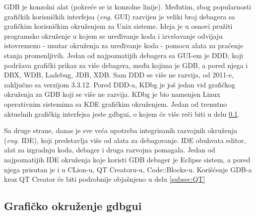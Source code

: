 \documentclass[a4paper]{article}
\begin{document}
GDB je konzolni alat (pokreće se iz konzolne linije). Međutim, zbog popularnosti grafičkih korisničkih interfejsa
(\textit{eng.} GUI) razvijen je veliki broj debagera sa grafičkim korisničkim okruženjem za Unix sisteme\cite{art_debugging}. 
Ideja je u osnovi pružiti programsko okruženje u kojem se uređivanje koda i izvršavanje odvijaju istovremeno - unutar okruženja za uređivanje
koda - pomocu alata za praćenje stanja promenljivih\cite{computerworld}.
Jedan od najpoznatijih debagera sa GUI-em je DDD, koji podržava grafički prikaz za više debagera, među kojima je
GDB, a pored njega i DBX, WDB, Ladebug, JDB, XDB. Sam DDD se više ne razvija, od 2011-e, zaključno sa verzijom 3.3.12. \cite{GNUOrg}
Pored DDD-a, KDbg je još jedan vid grafičkog okruženja za GDB koji se više ne razvija. KDbg je bio namenjen
Linux operativnim sistemima sa KDE grafičkim okruženjem. Jedan od trenutno aktuelnih grafičkig interfejsa jeste
gdbgui, o kojem će više reči biti u delu \ref{subsec:gdbgui}.

Sa druge strane, danas je sve veća upotreba integrisanih razvojnih okruženja (\textit{eng.} IDE),
koji predstavlja više od alata za debagovanje. IDE obuhvata editor, alat za izgradnju koda, debager i druga 
razvojna pomagala. Jedan od najpoznatijih IDE okruženja koje koristi GDB debager je Eclipse sistem,
a pored njega prisutan je i u CLion-u, QT Creatoru-u, Code::Blocks-u\cite{sourceware}.
Korišćenje GDB-a kroz QT Creator će biti podrobnije objašnjeno u delu \ref{subsec:QT}

\subsection{Grafičko okruženje gdbgui}
\label{subsec:gdbgui}
\end{document}
